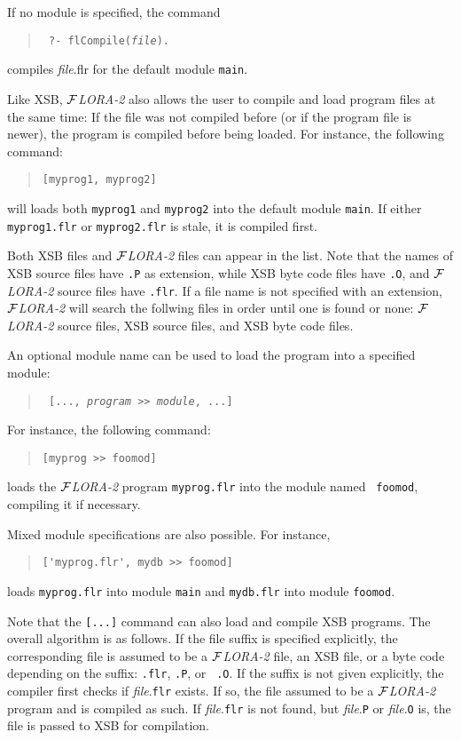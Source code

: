 \documentclass[11pt]{article}
\newcommand{\FLORA}{{\mbox{${\cal F}${\small\it LORA}\rm\emph{-2}}}\xspace}
\begin{document}
If no module is specified, the command
\begin{quote}
 \tt
 ?- flCompile({\it file}).
\end{quote}
compiles {\it file}.flr for the default module {\tt main}.


%
Like XSB, \FLORA also allows the user to compile and load program files at
the same time: If the file was not compiled before (or if the program file
is newer), the program is compiled before being loaded.
For instance, the following command:
\begin{quote}
\verb|[myprog1, myprog2]|
\end{quote}
will loads both {\tt myprog1} and {\tt myprog2} into the default module
{\tt main}. If either {\tt myprog1.flr} or {\tt myprog2.flr} is stale, it
is compiled first.

Both XSB files and \FLORA files can appear in the list. Note
that the names of XSB source files have {\tt .P} as extension,
while XSB byte code files have {\tt .O}, and \FLORA source files
have {\tt .flr}. If a file name is not specified with an extension,
\FLORA will search the follwing files in order until one is found
or none: \FLORA source files, XSB source files, and XSB byte code
files.

An optional module name can be used to load the program into a specified
module:
\begin{quote}
  \tt
[..., {\it program\/} >> {\it module}, ...]
\end{quote}
For instance, the following command:
\begin{quote}
\verb|[myprog >> foomod]|
\end{quote}
loads the \FLORA program {\tt myprog.flr} into the module named {\tt
  foomod}, compiling it if necessary.

Mixed module specifications are also possible. For instance, 
\begin{quote}
\verb|['myprog.flr', mydb >> foomod]|
\end{quote}
loads {\tt myprog.flr} into module {\tt main} and
{\tt mydb.flr} into module {\tt foomod}.

Note that the {\tt [...]} command can also load and compile XSB programs.
The overall algorithm is as follows. If the file suffix is specified
explicitly, the corresponding file is assumed to be a \FLORA file, an XSB
file, or a byte code depending on the suffix: {\tt .flr}, {\tt .P}, or {\tt
  .O}. If the suffix is not given explicitly, the compiler first checks if
{\it file}.{\tt flr} exists. If so, the file assumed to be a \FLORA program
and is compiled as such. If {\it file}.{\tt flr} is not found, but {\it
  file}.{\tt P} or {\it file}.{\tt O} is, the file is passed to XSB for
compilation.
\end{document}
